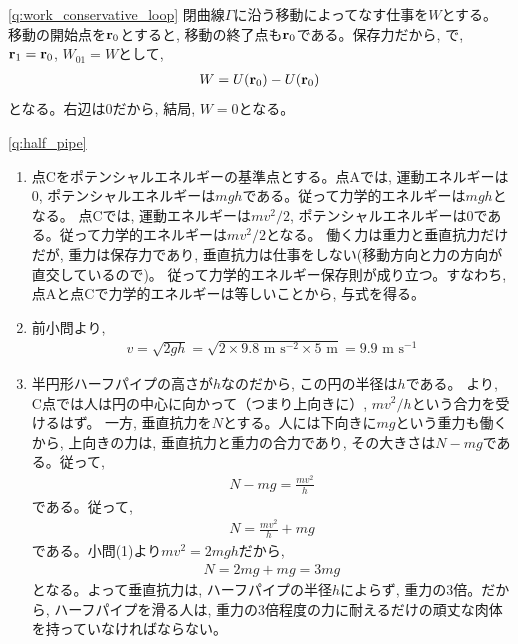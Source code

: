 \ref{q:work_conservative_loop}
閉曲線$\Gamma$に沿う移動によってなす仕事を$W$とする。
移動の開始点を${\bf r}_0$とすると, 移動の終了点も${\bf r}_0$である。保存力だから, 
で, ${\bf r}_1={\bf r}_0$, $W_{01}=W$として, 
\begin{eqnarray}
W=U({\bf r}_0)-U({\bf r}_0)
\end{eqnarray}
となる。右辺は0だから, 結局, $W=0$となる。\mv


\ref{q:half_pipe}
\begin{enumerate}
\item 点Cをポテンシャルエネルギーの基準点とする。点Aでは, 運動エネルギーは0, 
ポテンシャルエネルギーは$mgh$である。従って力学的エネルギーは$mgh$となる。
点Cでは, 運動エネルギーは$mv^2/2$, ポテンシャルエネルギーは0である。従って力学的エネルギーは$mv^2/2$となる。
働く力は重力と垂直抗力だけだが, 重力は保存力であり, 垂直抗力は仕事をしない(移動方向と力の方向が直交しているので)。
従って力学的エネルギー保存則が成り立つ。すなわち, 点Aと点Cで力学的エネルギーは等しいことから, 与式を得る。
\item 前小問より,
\begin{eqnarray*}
v=\sqrt{2gh}=\sqrt{2\times9.8\text{ m s}^{-2}\times5\text{ m}}=9.9\text{ m s}^{-1}
\end{eqnarray*}
\item 半円形ハーフパイプの高さが$h$なのだから, この円の半径は$h$である。
より, C点では人は円の中心に向かって（つまり上向きに）, 
$mv^2/h$という合力を受けるはず。
一方, 垂直抗力を$N$とする。人には下向きに$mg$という重力も働くから, 
上向きの力は, 垂直抗力と重力の合力であり, その大きさは$N-mg$である。従って, 
\begin{eqnarray}N-mg=\frac{mv^2}{h}\end{eqnarray}
である。従って, 
\begin{eqnarray}N=\frac{mv^2}{h}+mg\end{eqnarray}
である。小問(1)より$mv^2=2mgh$だから, 
\begin{eqnarray}N=2mg+mg=3mg\end{eqnarray}
となる。よって垂直抗力は, 
ハーフパイプの半径$h$によらず, 重力の3倍。だから, ハーフパイプを滑る人は, 
重力の3倍程度の力に耐えるだけの頑丈な肉体を持っていなければならない。
\end{enumerate}
\vspace{0.2cm}

